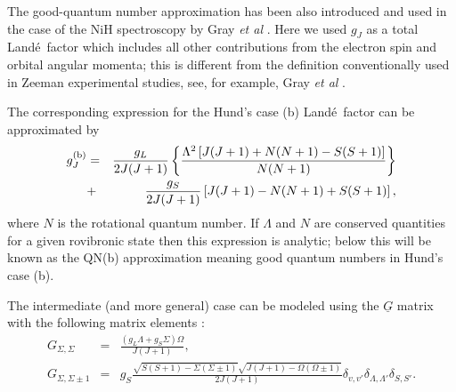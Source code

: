\documentclass[preprint,review,12pt]{elsarticle}
\newcommand{\red}[1]{{\color{red} #1}}
\newcommand{\2}{$_{2}$}
\newcommand{\3}{$_{3}$}
\newcommand{\4}{$_{4}$}
\newcommand{\8}{$^{18}$}
\newcommand{\6}{$^{16}$}
\newcommand{\7}{$^{17}$}
\newcommand{\lande}{Land\'e}
\begin{document}
The good-quantum number approximation has been also introduced and
used in the case of the NiH spectroscopy by Gray {\it et al}
\cite{90GrLiFi.NiH}. Here we used $g_J$ as a total \lande\ factor
which includes all other contributions from the electron spin and
orbital angular momenta; this is different from the definition
conventionally used in Zeeman experimental studies, see, for example,
Gray {\it et al} \cite{90GrLiFi.NiH}.

The corresponding expression for the Hund's case (b) \lande\ factor
can be approximated by \citet{02BeSoxx.diatom}
\begin{eqnarray}
\label{equation:lande_hunds_b}
g_J^{\rm (b)} &=& \frac{g_L}{2 J(J+1)} \left\{ \frac{\Lambda^2 \left[ J(J+1) + N(N+1) -S(S+1) \right] }{N (N+1)}
\right\} \notag \\
&+&  \frac{g_S}{2 J(J+1)}\left[ J(J+1) - N(N+1) +S(S+1)\right]  ,
\end{eqnarray}
where $N$ is the rotational quantum number. If $\Lambda$ and
$N$ are conserved quantities for a given rovibronic state then
this expression is analytic; below this will be known as the
QN(b) approximation meaning good  quantum numbers in Hund's case (b).

The intermediate (and more general) case can be modeled using the
$\underline{G}$ matrix with the following matrix elements
\cite{02BeSoxx.diatom}:
\begin{eqnarray}
  G_{\Sigma,\Sigma} &=& \frac{(g_L\Lambda+g_S\Sigma)\Omega }{J(J+1)}, \\
  G_{\Sigma,\Sigma\pm 1} &=& g_S \frac{\sqrt{S(S+1) - \Sigma (\Sigma\pm 1)} \sqrt{J(J+1) - \Omega (\Omega\pm 1)}
  }{2 J(J+1)} \delta_{v,v'} \delta_{\Lambda,\Lambda'} \delta_{S,S'}.
\end{eqnarray}
\end{document}

